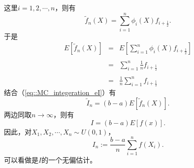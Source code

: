 这里$i = 1, 2, \cdots, n$，则有
$$
\tilde{f}_n(X) = \sum_{i = 1}^n \phi_i(X) f_{i + \frac{1}{2}}.
$$
于是
$$
\begin{array}{rcl}
  E[\tilde{f}_n(X)] &=& \displaystyle E\left[\sum_{i = 1}^n \phi_i(X) f_{i + \frac{1}{2}}\right]\\\\
  &=& \displaystyle \sum_{i = 1}^n \frac{1}{n} f_{i + \frac{1}{2}} \\\\
  &=& \displaystyle \frac{1}{n}\sum_{i = 1}^nf_{i + \frac{1}{2}}
\end{array}
$$
结合（\ref{eq::MC_integeration_eI}）有
$$
\tilde{I}_n = (b - a) E[\tilde{f}_n(X)].
$$
两边同取$n \to \infty$，则有
\begin{equation}
  I = (b - a) E[f(x)].
  \label{eq::MC_integeration_source}
\end{equation}
因此，对$X_1, X_2, \cdots, X_n \sim U(0, 1)$，
\begin{equation}
  I_n := \frac{b - a}{n} \sum_{i = 1}^n f(X_i).
  \label{eq::MC_integeration_estimation}
\end{equation}
可以看做是$I$的一个无偏估计。
